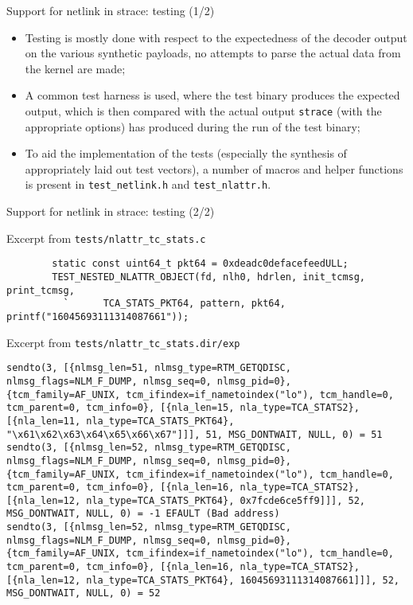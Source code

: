 \documentclass[unicode,aspectratio=169]{beamer}
\begin{document}
\begin{frame}[fragile]{Support for netlink in strace: testing \hfill (1/2)}
\begin{itemize}
  \item Testing is mostly done with respect to the expectedness of the decoder
        output on the various synthetic payloads, no attempts to parse
        the actual data from the kernel are made;
  \item A common test harness is used, where the test binary produces
        the expected output, which is then compared with the actual output
        \texttt{strace} (with the appropriate options) has produced during
        the run of the test binary;
  \item To aid the implementation of the tests (especially the synthesis
        of appropriately laid out test vectors), a number of macros
        and helper functions is present in \texttt{test\_netlink.h}
        and \texttt{test\_nlattr.h}.
\end{itemize}
\end{frame}

\begin{frame}[fragile]{Support for netlink in strace: testing \hfill (2/2)}
\begin{block}{Excerpt from \texttt{tests/nlattr\_tc\_stats.c}}
\begin{lstlisting}
        static const uint64_t pkt64 = 0xdeadc0defacefeedULL;
        TEST_NESTED_NLATTR_OBJECT(fd, nlh0, hdrlen, init_tcmsg, print_tcmsg,
          `      TCA_STATS_PKT64, pattern, pkt64, printf("16045693111314087661"));
\end{lstlisting}
\end{block}
\begin{block}{Excerpt from \texttt{tests/nlattr\_tc\_stats.dir/exp}}
\begin{lstlisting}
sendto(3, [{nlmsg_len=51, nlmsg_type=RTM_GETQDISC, nlmsg_flags=NLM_F_DUMP, nlmsg_seq=0, nlmsg_pid=0}, {tcm_family=AF_UNIX, tcm_ifindex=if_nametoindex("lo"), tcm_handle=0, tcm_parent=0, tcm_info=0}, [{nla_len=15, nla_type=TCA_STATS2}, [{nla_len=11, nla_type=TCA_STATS_PKT64}, "\x61\x62\x63\x64\x65\x66\x67"]]], 51, MSG_DONTWAIT, NULL, 0) = 51
sendto(3, [{nlmsg_len=52, nlmsg_type=RTM_GETQDISC, nlmsg_flags=NLM_F_DUMP, nlmsg_seq=0, nlmsg_pid=0}, {tcm_family=AF_UNIX, tcm_ifindex=if_nametoindex("lo"), tcm_handle=0, tcm_parent=0, tcm_info=0}, [{nla_len=16, nla_type=TCA_STATS2}, [{nla_len=12, nla_type=TCA_STATS_PKT64}, 0x7fcde6ce5ff9]]], 52, MSG_DONTWAIT, NULL, 0) = -1 EFAULT (Bad address)
sendto(3, [{nlmsg_len=52, nlmsg_type=RTM_GETQDISC, nlmsg_flags=NLM_F_DUMP, nlmsg_seq=0, nlmsg_pid=0}, {tcm_family=AF_UNIX, tcm_ifindex=if_nametoindex("lo"), tcm_handle=0, tcm_parent=0, tcm_info=0}, [{nla_len=16, nla_type=TCA_STATS2}, [{nla_len=12, nla_type=TCA_STATS_PKT64}, 16045693111314087661]]], 52, MSG_DONTWAIT, NULL, 0) = 52
\end{lstlisting}
\end{block}
\end{frame}
\end{document}
